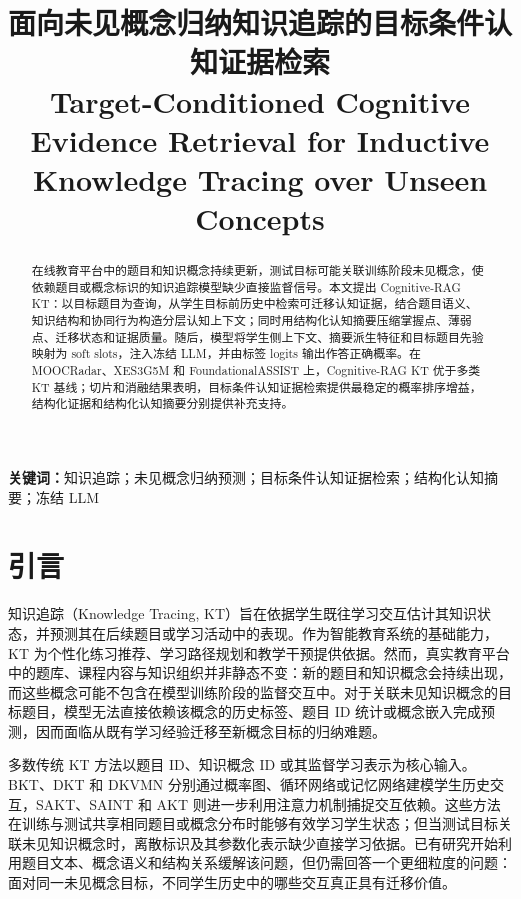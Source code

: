 \documentclass[UTF8,a4paper,12pt]{ctexart}
\title{\heiti 面向未见概念归纳知识追踪的目标条件认知证据检索\\[0.5em]
\large Target-Conditioned Cognitive Evidence Retrieval for Inductive Knowledge Tracing over Unseen Concepts}
\author{}
\date{}
\numberwithin{table}{section}
\begin{document}
\maketitle

\begin{abstract}


在线教育平台中的题目和知识概念持续更新，测试目标可能关联训练阶段未见概念，使依赖题目或概念标识的知识追踪模型缺少直接监督信号。本文提出 Cognitive-RAG KT：以目标题目为查询，从学生目标前历史中检索可迁移认知证据，结合题目语义、知识结构和协同行为构造分层认知上下文；同时用结构化认知摘要压缩掌握点、薄弱点、迁移状态和证据质量。随后，模型将学生侧上下文、摘要派生特征和目标题目先验映射为 soft slots，注入冻结 LLM，并由标签 logits 输出作答正确概率。在 MOOCRadar、XES3G5M 和 FoundationalASSIST 上，Cognitive-RAG KT 优于多类 KT 基线；切片和消融结果表明，目标条件认知证据检索提供最稳定的概率排序增益，结构化证据和结构化认知摘要分别提供补充支持。
\end{abstract}

\noindent\textbf{关键词：}知识追踪；未见概念归纳预测；目标条件认知证据检索；结构化认知摘要；冻结 LLM

\section{引言}



知识追踪（Knowledge Tracing, KT）旨在依据学生既往学习交互估计其知识状态，并预测其在后续题目或学习活动中的表现。作为智能教育系统的基础能力，KT 为个性化练习推荐、学习路径规划和教学干预提供依据。然而，真实教育平台中的题库、课程内容与知识组织并非静态不变：新的题目和知识概念会持续出现，而这些概念可能不包含在模型训练阶段的监督交互中。对于关联未见知识概念的目标题目，模型无法直接依赖该概念的历史标签、题目 ID 统计或概念嵌入完成预测，因而面临从既有学习经验迁移至新概念目标的归纳难题。



多数传统 KT 方法以题目 ID、知识概念 ID 或其监督学习表示为核心输入。BKT、DKT 和 DKVMN 分别通过概率图、循环网络或记忆网络建模学生历史交互，SAKT、SAINT 和 AKT 则进一步利用注意力机制捕捉交互依赖\citep{corbett1995knowledge,piech2015deep,zhang2017dynamic,pandey2019sakt,choi2020saint,ghosh2020akt}。这些方法在训练与测试共享相同题目或概念分布时能够有效学习学生状态；但当测试目标关联未见知识概念时，离散标识及其参数化表示缺少直接学习依据。已有研究开始利用题目文本、概念语义和结构关系缓解该问题\citep{fu2024sinkt}，但仍需回答一个更细粒度的问题：面对同一未见概念目标，不同学生历史中的哪些交互真正具有迁移价值。
\end{document}
